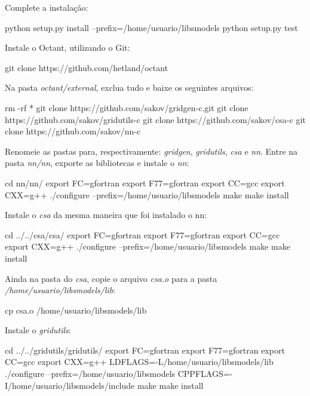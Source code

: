 \noindent Complete a instalação:
\bigskip

\begin{bashcode}
python setup.py install --prefix=/home/usuario/libsmodels
python setup.py test
\end{bashcode}
\bigskip

\noindent Instale o Octant, utilizando o Git:
\bigskip

\begin{bashcode}
git clone https://github.com/hetland/octant
\end{bashcode}
\bigskip

\noindent Na pasta \textit{octant/external}, exclua tudo e baixe os seguintes arquivos:
\bigskip

\begin{bashcode}
rm -rf *
git clone https://github.com/sakov/gridgen-c.git
git clone https://github.com/sakov/gridutils-c
git clone https://github.com/sakov/csa-c
git clone https://github.com/sakov/nn-c
\end{bashcode}
\bigskip

\noindent Renomeie as pastas para, respectivamente: \textit{gridgen}, \textit{gridutils}, \textit{csa} e \textit{nn}. Entre na pasta \textit{nn/nn}, exporte as bibliotecas e instale o \textit{nn}:
\bigskip

\begin{bashcode}
cd nn/nn/
export FC=gfortran
export F77=gfortran
export CC=gcc
export CXX=g++
./configure --prefix=/home/usuario/libsmodels
make
make install
\end{bashcode}
\bigskip

\noindent Instale o \textit{csa} da mesma maneira que foi instalado o nn:
\bigskip

\begin{bashcode}
cd ../../csa/csa/
export FC=gfortran
export F77=gfortran
export CC=gcc
export CXX=g++
./configure --prefix=/home/usuario/libsmodels
make
make install
\end{bashcode}
\bigskip

\noindent Ainda na pasta do \textit{csa}, copie o arquivo \textit{csa.o} para a pasta \textit{/home/usuario/libsmodels/lib}:
\bigskip

\begin{bashcode}
cp csa.o /home/usuario/libsmodels/lib
\end{bashcode}
\bigskip

\noindent Instale o \textit{gridutils}:
\bigskip

\begin{bashcode}[fontsize=\scriptsize]
cd ../../gridutils/gridutils/
export FC=gfortran
export F77=gfortran
export CC=gcc
export CXX=g++
LDFLAGS=-L/home/usuario/libsmodels/lib
./configure --prefix=/home/usuario/libsmodels CPPFLAGS=-I/home/usuario/libsmodels/include
make
make install
\end{bashcode}
\bigskip

